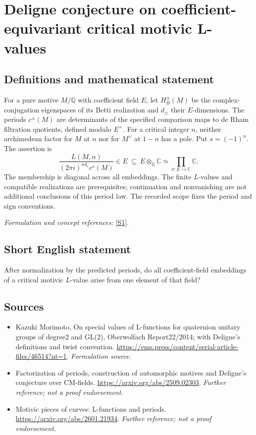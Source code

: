 \documentclass[11pt]{article}
\begin{document}
\section*{\texorpdfstring{Deligne conjecture on coefficient-equivariant critical motivic L-values}{Deligne conjecture on coefficient-equivariant critical motivic L-values}}\label{71}
\subsection{Definitions and mathematical statement}
For a pure motive $M/{\mathbb{Q}}$ with coefficient field $E$, let $H_B^\pm(M)$ be the complex-conjugation eigenspaces of its Betti realization and $d_\pm$ their $E$-dimensions. The periods $c^\pm(M)$ are determinants of the specified comparison maps to de Rham filtration quotients, defined modulo $E^\times$. For a critical integer $n$, neither archimedean factor for $M$ at $n$ nor for $M^\vee$ at $1-n$ has a pole. Put $s=(-1)^n$. The assertion is
\[
 \frac{L(M,n)}{(2\pi i)^{n d_s}c^s(M)}\in E
 \ \subseteq\ E\otimes_{{\mathbb{Q}}}{\mathbb{C}}\simeq\prod_{\sigma:E\hookrightarrow{\mathbb{C}}}{\mathbb{C}}.
\]
The membership is diagonal across all embeddings. The finite $L$-values and compatible realizations are prerequisites; continuation and nonvanishing are not additional conclusions of this period law. The recorded scope fixes the period and sign conventions.
\par\smallskip\textit{Formulation and concept references:} \href{https://ems.press/content/serial-article-files/46514?nt=1}{[S1]}.

\subsection{Short English statement}
After normalization by the predicted periods, do all coefficient-field embeddings of a critical motivic $L$-value arise from one element of that field?
\subsection{Sources}
\begin{itemize}
\item[S1]Kazuki Morimoto, On special values of L-functions for quaternion unitary groups of degree2 and GL(2), Oberwolfach Report22/2014; with Deligne's definitions and twist convention.
\url{https://ems.press/content/serial-article-files/46514?nt=1}.
\textit{Formulation source.}
\item[S2]Factorization of periods, construction of automorphic motives and Deligne's conjecture over CM-fields.
\url{https://arxiv.org/abs/2509.02303}.
\textit{Further reference; not a proof endorsement.}
\item[S3]Motivic pieces of curves: L-functions and periods.
\url{https://arxiv.org/abs/2601.21934}.
\textit{Further reference; not a proof endorsement.}
\end{itemize}
\end{document}

